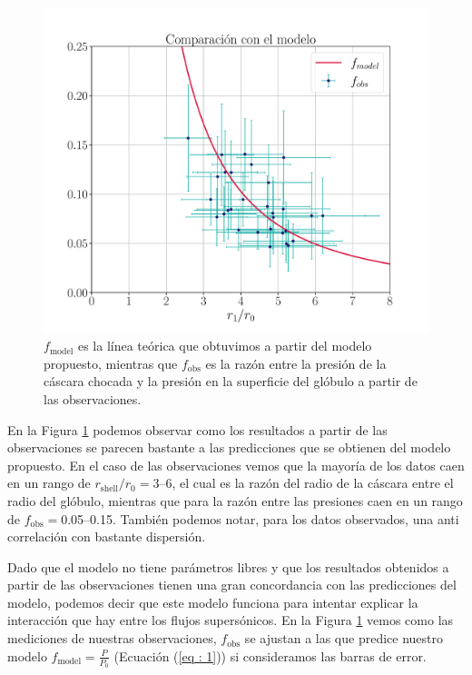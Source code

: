 \documentclass{book}
\begin{document}
\begin{figure}[htb]
    \centering
    \includegraphics[width=\textwidth]{ultimos/R_2(1).pdf}
    \caption{$f_\mathrm{model}$ es la línea teórica que obtuvimos a partir del modelo propuesto, mientras que $f_\mathrm{obs}$ es la razón entre la presión de la cáscara chocada  y la presión en la superficie del glóbulo a partir de las observaciones.}
    \label{Resultados_modelo}
\end{figure}

En la Figura \ref{Resultados_modelo} podemos observar como los resultados a partir de las observaciones se parecen bastante a las predicciones que se obtienen del modelo propuesto. En el caso de las observaciones vemos que la mayoría de los datos caen en un  rango de $r_\mathrm{shell}/r_0=$3--6, el cual es la razón del radio de la cáscara entre el radio del glóbulo, mientras que para la razón entre las presiones caen en un rango de $f_\mathrm{obs}=$0.05--0.15. También podemos notar, para los datos observados, una anti correlación con bastante dispersión.

Dado que el modelo no tiene parámetros libres y que los resultados obtenidos a partir de las observaciones tienen una gran concordancia con las predicciones del modelo, podemos decir que este modelo funciona para intentar explicar la interacción que hay entre los flujos supersónicos. En la Figura \ref{Resultados_modelo} vemos como las mediciones de nuestras observaciones, $f_\mathrm{obs}$ se ajustan a las que predice nuestro modelo $f_\mathrm{model}=\frac{P}{P_0}$ (Ecuación (\ref{eq : 1})) si consideramos las barras de error.
\end{document}
